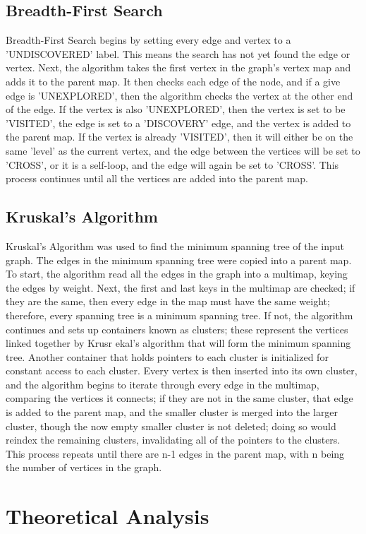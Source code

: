 \documentclass[titlepage]{article}
\begin{document}
\begin{multicols}{2}
			\subsection{Breadth-First Search}
                        Breadth-First Search begins by setting every edge and vertex to a 'UNDISCOVERED' label. This means the search has not yet found the edge or vertex. Next, the algorithm takes the first vertex in the graph's vertex map and adds it to the parent map. It then checks each edge of the node, and if a give edge is 'UNEXPLORED', then the algorithm checks the vertex at the other end of the edge. If the vertex is also 'UNEXPLORED', then the vertex is set to be 'VISITED', the edge is set to a 'DISCOVERY' edge, and the vertex is added to the parent map. If the vertex is already 'VISITED', then it will either be on the same 'level' as the current vertex, and the edge between the vertices will be set to 'CROSS', or it is a self-loop, and the edge will again be set to 'CROSS'. This process continues until all the vertices are added into the parent map.
			\subsection{Kruskal's Algorithm}
                         Kruskal's Algorithm was used to find the minimum spanning tree of the input graph. The edges in the minimum spanning tree were copied into a parent map. To start, the algorithm read all the edges in the graph into a multimap, keying the edges by weight. Next, the first and last keys in the multimap are checked; if they are the same, then every edge in the map must have the same weight; therefore, every spanning tree is a minimum spanning tree. If not, the algorithm continues and sets up containers known as clusters; these represent the vertices linked together by Krusr ekal's algorithm that will form the minimum spanning tree. Another container that holds pointers to each cluster is initialized for constant access to each cluster. Every vertex is then inserted into its own cluster, and the algorithm begins to iterate through every edge in the multimap, comparing the vertices it connects; if they are not in the same cluster, that edge is added to the parent map, and the smaller cluster is merged into the larger cluster, though the now empty smaller cluster is not deleted; doing so would reindex the remaining clusters, invalidating all of the pointers to the clusters. This process repeats until there are n-1 edges in the parent map, with n being the number of vertices in the graph.
		\section{Theoretical Analysis}

\end{multicols}
\end{document}
